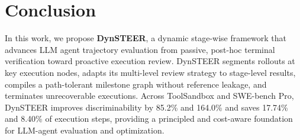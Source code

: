 \section{Conclusion}
\label{sec:conclusion}

In this work, we propose \textbf{DynSTEER}, a dynamic stage-wise framework that advances LLM agent trajectory evaluation from passive, post-hoc terminal verification toward proactive execution review.
DynSTEER segments rollouts at key execution nodes, adapts its multi-level review strategy to stage-level results, compiles a path-tolerant milestone graph without reference leakage, and terminates unrecoverable executions.
Across ToolSandbox and SWE-bench Pro, DynSTEER improves discriminability by 85.2\% and 164.0\% and saves 17.74\% and 8.40\% of execution steps, providing a principled and cost-aware foundation for LLM-agent evaluation and optimization.
